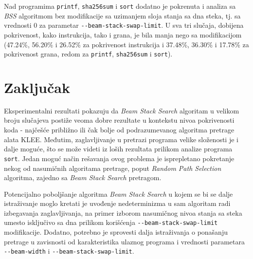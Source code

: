 \documentclass[a4paper]{article}
\begin{document}
Nad programima \verb|printf|, \verb|sha256sum| i \verb|sort| dodatno je pokrenuta i analiza sa \textit{BSS} algoritmom bez modifikacije sa uzimanjem sloja stanja sa dna steka, tj. sa vrednosti 0 za parametar \verb|--beam-stack-swap-limit|. U sva tri slučaja, dobijena pokrivenost, kako instrukcija, tako i grana, je bila manja nego sa modifikacijom (47.24\%, 56.20\% i 26.52\% za pokrivenost instrukcija i 37.48\%, 36.30\% i 17.78\% za pokrivenost grana, redom za \verb|printf|, \verb|sha256sum| i \verb|sort|).

\section{Zaključak}

Eksperimentalni rezultati pokazuju da \textit{Beam Stack Search} algoritam u velikom broju slučajeva postiže veoma dobre rezultate u kontekstu nivoa pokrivenosti koda - najčešće približno ili čak bolje od podrazumevanog algoritma pretrage alata KLEE. Međutim, zaglavljivanje u pretrazi programa velike složenosti je i dalje moguće, što se može videti iz loših rezultata prilikom analize programa \verb|sort|. Jedan moguć način rešavanja ovog problema je isprepletano pokretanje nekog od nasumičnih algoritama pretrage, poput \textit{Random Path Selection} algoritma, zajedno sa \textit{Beam Stack Search} pretragom.

Potencijalno poboljšanje algoritma \textit{Beam Stack Search} u kojem se bi se dalje istraživanje moglo kretati je uvođenje nedeterminizma u sam algoritam radi izbegavanja zaglavljivanja, na primer izborom nasumičnog nivoa stanja sa steka umesto isključivo sa dna prilikom korišćenja \verb|--beam-stack-swap-limit| modifikacije. Dodatno, potrebno je sprovesti dalja istraživanja o ponašanju pretrage u zavisnosti od karakteristika ulaznog programa i vrednosti parametara \verb|--beam-width| i \verb|--beam-stack-swap-limit|.

\appendix


\end{document}

